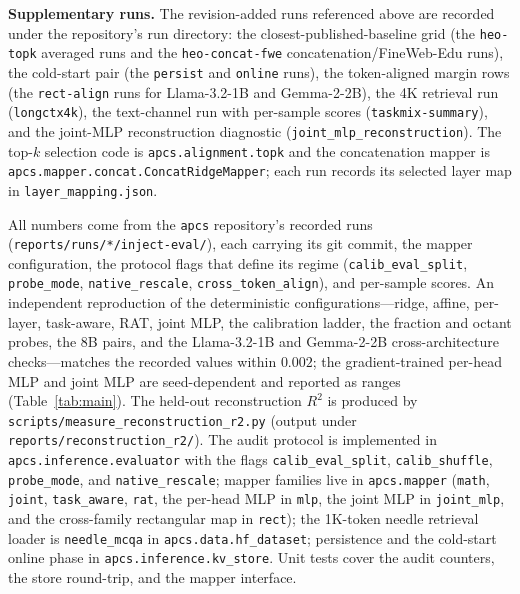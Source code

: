 \documentclass{article} %
\begin{document}
\textbf{Supplementary runs.} The revision-added runs referenced above are
recorded under the repository's run directory: the closest-published-baseline
grid (the \texttt{heo-topk} averaged runs and the \texttt{heo-concat-fwe}
concatenation/FineWeb-Edu runs), the cold-start pair (the \texttt{persist} and
\texttt{online} runs), the token-aligned margin rows (the \texttt{rect-align}
runs for Llama-3.2-1B and Gemma-2-2B), the 4K retrieval run
(\texttt{longctx4k}), the text-channel run with per-sample scores
(\texttt{taskmix-summary}), and the joint-MLP reconstruction diagnostic
(\texttt{joint\_mlp\_reconstruction}). The top-$k$ selection code is
\texttt{apcs.alignment.topk} and the concatenation mapper is
\texttt{apcs.mapper.concat.ConcatRidgeMapper}; each run records its selected
layer map in \texttt{layer\_mapping.json}.

All numbers come from the \texttt{apcs} repository's recorded runs
(\texttt{reports/runs/*/inject-eval/}), each carrying its git commit, the
mapper configuration, the protocol flags that define its regime
(\texttt{calib\_eval\_\allowbreak split}, \texttt{probe\_mode},
\texttt{native\_\allowbreak rescale},
\texttt{cross\_\allowbreak token\_\allowbreak align}), and per-sample scores. An independent
reproduction of the deterministic configurations---ridge, affine, per-layer,
task-aware, RAT, joint MLP, the calibration ladder, the fraction and octant
probes, the 8B pairs, and the Llama-3.2-1B and Gemma-2-2B cross-architecture
checks---matches the recorded values within
$0.002$; the gradient-trained per-head MLP and joint MLP are seed-dependent and
reported as ranges (Table~\ref{tab:main}). The held-out
reconstruction $R^2$ is produced by \texttt{scripts/measure\_reconstruction\_r2.py}
(output under \texttt{reports/reconstruction\_r2/}). The audit protocol
is implemented in \texttt{apcs.\allowbreak inference.\allowbreak evaluator}
with the flags
\texttt{calib\_eval\_\allowbreak split}, \texttt{calib\_shuffle},
\texttt{probe\_mode},
and \texttt{native\_\allowbreak rescale}; mapper families live in
\texttt{apcs.\allowbreak mapper}
(\texttt{math}, \texttt{joint}, \texttt{task\_\allowbreak aware}, \texttt{rat}, the
per-head MLP in \texttt{mlp}, the joint MLP in \texttt{joint\_\allowbreak mlp}, and the
cross-family rectangular map in \texttt{rect}); the
1K-token needle retrieval loader is \texttt{needle\_\allowbreak mcqa} in
\texttt{apcs.\allowbreak data.\allowbreak hf\_\allowbreak dataset};
persistence and the cold-start online phase in
\texttt{apcs.inference.kv\_store}. Unit tests cover the audit counters, the
store round-trip, and the mapper interface.
\end{document}
